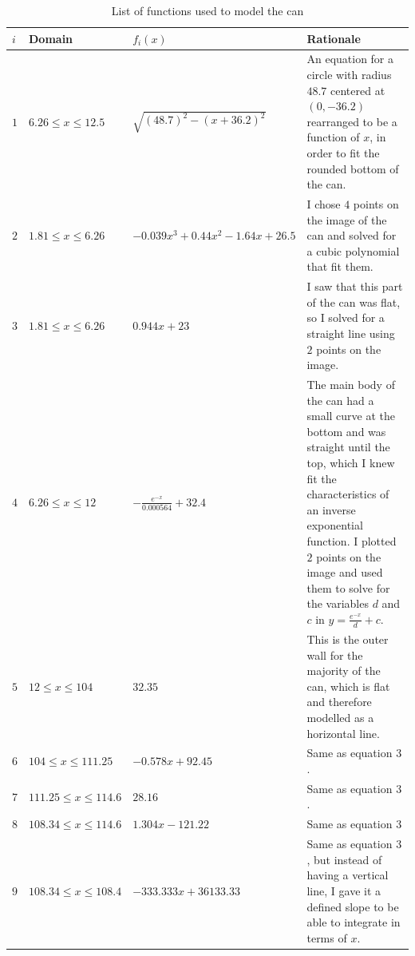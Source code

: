 \documentclass[11pt]{article}
\begin{document}
    \begin{table}[H]
        \scriptsize
        \renewcommand{\arraystretch}{0.9}
        \centering
        \caption{List of functions used to model the can}
        \vspace{-8pt}
        \begin{tabularx}{\textwidth}{|l|l|l|X|}
            \hline
            $i$ & Domain & $f_i(x)$ & Rationale \\
            \hline \hline
            $1$ & $6.26 \le x \le 12.5$ & $\sqrt{(48.7)^2 - (x + 36.2)^2}$ & An equation for a circle with radius $48.7$ centered at $(0,-36.2)$ rearranged to be a function of $x$, in order to fit the rounded bottom of the can. \\
            \hline
            $2$ & $1.81 \le x \le 6.26$ & $-0.039x^3 + 0.44x^2 - 1.64x + 26.5$ & I chose $4$ points on the image of the can and solved for a cubic polynomial that fit them. \\
            \hline
            $3$ & $1.81 \le x \le 6.26$ & $0.944x + 23$ & I saw that this part of the can was flat, so I solved for a straight line using $2$ points on the image. \\
            \hline
            $4$ & $6.26 \le x \le 12$ & $-\frac{e^{-x}}{0.000564} + 32.4$ & The main body of the can had a small curve at the bottom and was straight until the top, which I knew fit the characteristics of an inverse exponential function. I plotted $2$ points on the image and used them to solve for the variables $d$ and $c$ in $y = \frac{e^{-x}}{d} + c$. \\
            \hline
            $5$ & $12 \le x \le 104$ & $32.35$ & This is the outer wall for the majority of the can, which is flat and therefore modelled as a horizontal line. \\
            \hline
            $6$ & $104 \le x \le 111.25$ & $-0.578x + 92.45$ & Same as equation $3$. \\
            \hline
            $7$ & $111.25 \le x \le 114.6$ & $28.16$ & Same as equation $3$. \\
            \hline
            $8$ & $108.34 \le x \le 114.6$ & $1.304x - 121.22$ & Same as equation $3$ \\
            \hline
            $9$ & $108.34 \le x \le 108.4$ & $-333.333x + 36133.33$ & Same as equation $3$, but instead of having a vertical line, I gave it a defined slope to be able to integrate in terms of $x$. \\
            \hline
        \end{tabularx}
        \label{tab:functions}
    \end{table}
    \vspace{-10pt}
\end{document}

